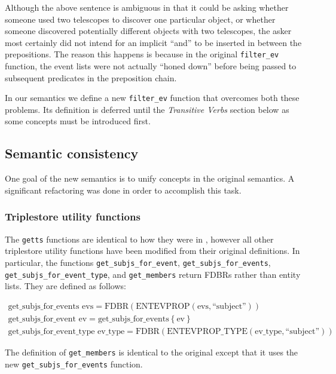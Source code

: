 \documentclass[../main.tex]{subfiles}
\begin{document}
Although the above sentence is ambiguous in that it could be asking whether someone used two telescopes to discover one particular object, or whether
someone discovered potentially different objects with two telescopes, the asker most certainly did not intend for an implicit ``and'' to be inserted in between the prepositions.
The reason this happens is because in the original \texttt{filter\_ev} function, the event lists were not actually ``honed down'' before being passed to subsequent predicates in the preposition chain.

In our semantics we define a new \texttt{filter\_ev} function that overcomes
both these problems.  Its definition is deferred until the {\em Transitive Verbs}
section below as some concepts must be introduced first.

\subsection{Semantic consistency}

One goal of the new semantics is to unify concepts in the original semantics.  A significant refactoring was done in order to 
accomplish this task.

\subsubsection{Triplestore utility functions}

The \texttt{getts} functions are identical to how they were in \cite{frost2013event}, however
all other triplestore utility functions have been modified from their original definitions.
In particular, the functions \texttt{get\_subjs\_for\_event}, \texttt{get\_subjs\_for\_events},
\texttt{get\_subjs\_for\_event\_type}, and \texttt{get\_members} return FDBRs rather than entity lists.  They are defined as follows:

\begin{multline*}
  \text{get\_subjs\_for\_events evs} = \text{FDBR}(\text{ENTEVPROP}(\text{evs}, \text{``subject''})) \\
  \text{get\_subjs\_for\_event ev} = \text{get\_subjs\_for\_events}\left\{\text{ev}\right\} \\
  \text{get\_subjs\_for\_event\_type ev\_type} = \text{FDBR}(\text{ENTEVPROP\_TYPE}(\text{ev\_type}, \text{``subject''}))
\end{multline*}

The definition of \texttt{get\_members} is identical to the original except that it uses the new \texttt{get\_subjs\_for\_events} function.
\end{document}
